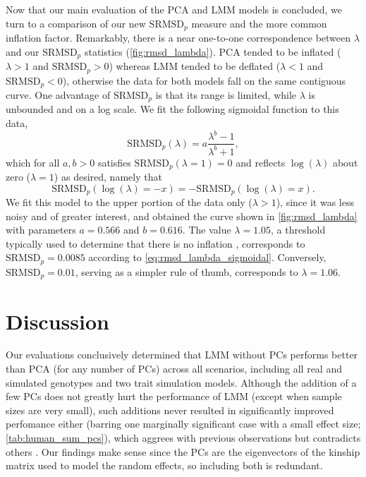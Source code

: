 \documentclass[11pt]{article}
\newcommand{\rmsd}{\text{SRMSD}_p}
\begin{document}
Now that our main evaluation of the PCA and LMM models is concluded, we turn to a comparison of our new $\rmsd$ measure and the more common inflation factor.
Remarkably, there is a near one-to-one correspondence between $\lambda$ and our $\rmsd$ statistics (\cref{fig:rmsd_lambda}).
PCA tended to be inflated ($\lambda > 1$ and $\rmsd > 0$) whereas LMM tended to be deflated ($\lambda < 1$ and $\rmsd < 0$), otherwise the data for both models fall on the same contiguous curve.
One advantage of $\rmsd$ is that its range is limited, while $\lambda$ is unbounded and on a log scale.
We fit the following sigmoidal function to this data,
\begin{equation}
  \label{eq:rmsd_lambda_sigmoidal}
  \rmsd( \lambda ) = a \frac{ \lambda^b - 1 }{ \lambda^b + 1 },
\end{equation}
which for all $a,b > 0$ satisfies $\rmsd( \lambda = 1 ) = 0$ and reflects $\log( \lambda )$ about zero ($\lambda = 1$) as desired, namely that
$$
\rmsd( \log( \lambda ) = -x ) = - \rmsd( \log( \lambda ) = x ).
$$
We fit this model to the upper portion of the data only ($\lambda > 1$), since it was less noisy and of greater interest, and obtained the curve shown in \cref{fig:rmsd_lambda} with parameters $a = 0.566$ and $b = 0.616$.
The value $\lambda = 1.05$, a threshold typically used to determine that there is no inflation \citep{price_new_2010}, corresponds to $\rmsd = 0.0085$ according to \cref{eq:rmsd_lambda_sigmoidal}.
Conversely, $\rmsd = 0.01$, serving as a simpler rule of thumb, corresponds to $\lambda = 1.06$.


\section{Discussion}

Our evaluations conclusively determined that LMM without PCs performs better than PCA (for any number of PCs) across all scenarios, including all real and simulated genotypes and two trait simulation models.
Although the addition of a few PCs does not greatly hurt the performance of LMM (except when sample sizes are very small), such additions never resulted in significantly improved perfomance either (barring one marginally significant case with a small effect size; \cref{tab:human_sum_pcs}), which aggrees with previous observations \citep{liu_controlling_2011} but contradicts others \citep{zhao_arabidopsis_2007, price_new_2010}.
Our findings make sense since the PCs are the eigenvectors of the kinship matrix used to model the random effects, so including both is redundant.
\end{document}
